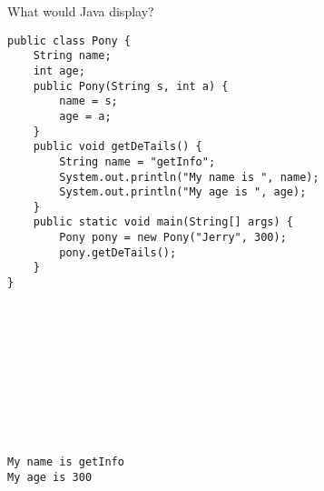 \question What would Java display? 
\begin{lstlisting}
public class Pony {
    String name;
    int age;
    public Pony(String s, int a) {
        name = s;
        age = a;
    }
    public void getDeTails() {
        String name = "getInfo";
        System.out.println("My name is ", name);
        System.out.println("My age is ", age);
    }
    public static void main(String[] args) {
        Pony pony = new Pony("Jerry", 300);
        pony.getDeTails();
    }
}











\end{lstlisting}

\begin{solution}[1.5in]
\begin{verbatim}
My name is getInfo
My age is 300
\end{verbatim}
\end{solution}
